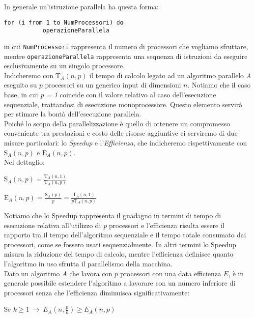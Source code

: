 In generale un'istruzione parallela ha questa forma:
\begin{verbatim}
for (i from 1 to NumProcessori) do
           operazioneParallela
\end{verbatim}
in cui \texttt{NumProcessori} rappresenta il numero di processori che vogliamo sfruttare, mentre \texttt{operazioneParallela} rappresenta una sequenza di istruzioni da eseguire esclusivamente su un singolo processore.\\
Indicheremo con $\mathrm{T}_{A}(n, p)$ il tempo di calcolo legato ad un algoritmo parallelo \textit{A} eseguito su $p$ processori su un generico input di dimensioni $n$. Notiamo che il caso base, in cui \textit{p = 1} coincide con il valore relativo al caso dell'esecuzione sequenziale, trattandosi di esecuzione monoprocessore. Questo elemento servirà per stimare la bontà dell'esecuzione parallela.\\
Poiché lo scopo della parallelizzazione è quello di ottenere un compromesso conveniente tra prestazioni e costo delle risorse aggiuntive ci serviremo di due misure particolari: lo \textit{Speedup} e l'\textit{Efficienza}, che indicheremo rispettivamente con $\mathrm{S}_{A}(n, p)$ e $\mathrm{E}_{A}(n, p)$.\\
Nel dettaglio:
\begin{center}
$\displaystyle \mathrm{S}_{A}(n, p) = \frac{\mathrm{T}_{A}(n, 1)}{\mathrm{T}_{A}(n, p)}$
\end{center}
\begin{center}
$\displaystyle \mathrm{E}_{A}(n, p) = \frac{\mathrm{S}_{A}(p)}{p} = \frac{\mathrm{T}_{A}(n, 1)}{p\mathrm{T}_{A}(n, p)}$
\end{center}
\newpage
\noindent Notiamo che lo Speedup rappresenta il guadagno in termini di tempo di esecuzione relativa all'utilizzo di \textit{p} processori e l'efficienza risulta essere il rapporto tra il tempo dell'algoritmo sequenziale e il tempo totale consumato dai processori, come se fossero usati sequenzialmente. In altri termini lo Speedup misura la riduzione del tempo di calcolo, mentre l'efficienza definisce quanto l'algoritmo in uso sfrutta il parallelismo della macchina.\\
Dato un algoritmo $A$ che lavora con $p$ processori con una data efficienza $E$, è in
generale possibile estendere l'algoritmo a lavorare con un numero inferiore di processori senza che l'efficienza diminuisca significativamente:
\begin{center}
Se $k \geq 1 \ \rightarrow \ E_{A}(n, \frac{p}{k}) \geq E_{A}(n,p)$
\end{center}
